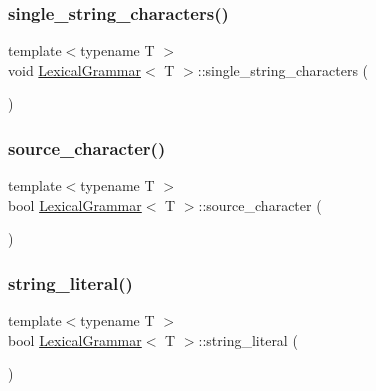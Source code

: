 \mbox{\label{class_lexical_grammar_aa7f181acaa775e99a212d2e357cae599}} 
\subsubsection{\texorpdfstring{single\+\_\+string\+\_\+characters()}{single\_string\_characters()}}
{\footnotesize\ttfamily template$<$typename T $>$ \\
void \hyperlink{class_lexical_grammar}{Lexical\+Grammar}$<$ T $>$\+::single\+\_\+string\+\_\+characters (\begin{DoxyParamCaption}{ }\end{DoxyParamCaption})\hspace{0.3cm}{\ttfamily [inline]}}

\mbox{\label{class_lexical_grammar_ad3f57a97b726239f8561556e2c920c09}} 
\subsubsection{\texorpdfstring{source\+\_\+character()}{source\_character()}}
{\footnotesize\ttfamily template$<$typename T $>$ \\
bool \hyperlink{class_lexical_grammar}{Lexical\+Grammar}$<$ T $>$\+::source\+\_\+character (\begin{DoxyParamCaption}{ }\end{DoxyParamCaption})\hspace{0.3cm}{\ttfamily [inline]}}

\mbox{\label{class_lexical_grammar_a11294149e962d00a92cacc8c6567cdc5}} 
\subsubsection{\texorpdfstring{string\+\_\+literal()}{string\_literal()}}
{\footnotesize\ttfamily template$<$typename T $>$ \\
bool \hyperlink{class_lexical_grammar}{Lexical\+Grammar}$<$ T $>$\+::string\+\_\+literal (\begin{DoxyParamCaption}{ }\end{DoxyParamCaption})\hspace{0.3cm}{\ttfamily [inline]}}

